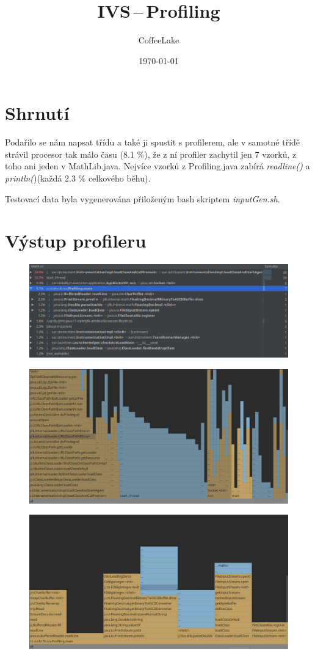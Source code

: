 \documentclass[a4paper, 11pt]{article}
\title{IVS\,--\,Profiling}
\author{CoffeeLake}
\date{\today}
\begin{document}
	
	\maketitle
	
	\section{Shrnutí}
	
	Podařilo se nám napsat třídu a také ji spustit s profilerem, ale v samotné třídě strávil procesor tak málo času (8.1 \%), že z ní profiler zachytil jen 7 vzorků, z toho ani jeden v MathLib.java. Nejvíce vzorků z Profiling.java zabírá \emph{readline()} a \emph{println(})(každá 2.3 \% celkového běhu).
	
	Testovací data byla vygenerována přiloženým bash skriptem \emph{inputGen.sh}.
	
	\newpage
	\section{ Výstup profileru}
	
	\begin{figure}[ht]
		\centering
		\includegraphics[width=.7\textwidth]{profiling1.png}
	\end{figure}
	
	\begin{figure}[ht]
		\centering
		\includegraphics[width=.7\textwidth]{profiling2.png}
	\end{figure}

	\begin{figure}[ht]
		\centering
		\includegraphics[width=.7\textwidth]{profiling3.png}
	\end{figure}
	
\end{document}
